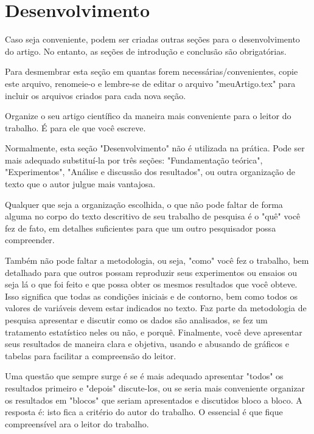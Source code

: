 

\section{Desenvolvimento}\label{sec:desenvolvimento}	%


Caso seja conveniente, podem ser criadas outras seções para o desenvolvimento do artigo. No entanto, as seções de introdução e conclusão são obrigatórias.

Para desmembrar esta seção em quantas forem necessárias/convenientes, copie este arquivo, renomeie-o e lembre-se de editar o arquivo "meuArtigo.tex" para incluir os arquivos criados para cada nova seção.

Organize o seu artigo científico da maneira mais conveniente para o leitor do trabalho. É para ele que você escreve.

Normalmente, esta seção "Desenvolvimento" não é utilizada na prática. Pode ser mais adequado substituí-la por três seções: "Fundamentação teórica", "Experimentos", "Análise e discussão dos resultados", ou outra organização de texto que o autor julgue mais vantajosa.

Qualquer que seja a organização escolhida, o que não pode faltar de forma alguma no corpo do texto descritivo de seu trabalho de pesquisa é o "quê" você fez de fato, em detalhes suficientes para que um outro pesquisador possa compreender.

Também não pode faltar a metodologia, ou seja, "como" você fez o trabalho, bem detalhado para que outros possam reproduzir seus experimentos ou ensaios ou seja lá o que foi feito e que possa obter os mesmos resultados que você obteve. Isso significa que todas as condições iniciais e de contorno, bem como todos os valores de variáveis devem estar indicados no texto. Faz parte da metodologia de pesquisa apresentar e discutir como os dados são analisados, se fez um tratamento estatístico neles ou não, e porquê. Finalmente, você deve apresentar seus resultados de maneira clara e objetiva, usando e abusando de gráficos e tabelas para facilitar a compreensão do leitor.

Uma questão que sempre surge é se é mais adequado apresentar "todos" os resultados primeiro e "depois" discute-los, ou se seria mais conveniente organizar os resultados em "blocos" que seriam apresentados e discutidos  bloco a bloco. A resposta é: isto fica a critério do autor do trabalho. O essencial é que fique compreensível ara o leitor do trabalho. 


